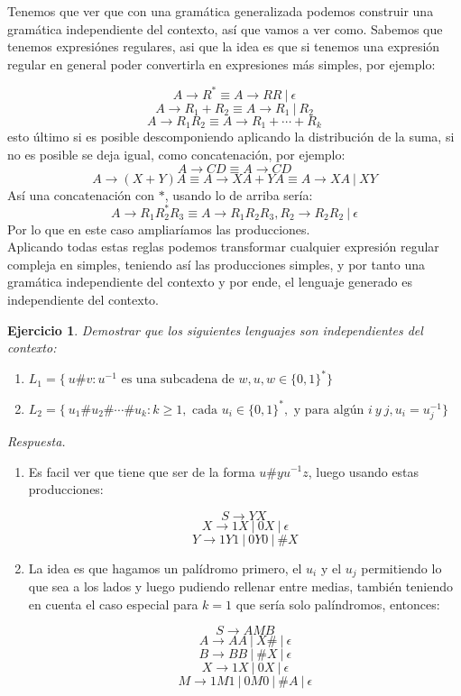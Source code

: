 \documentclass[11pt]{article}
\theoremstyle{ejercicio-style}
\newtheorem{ejer}{Ejercicio}
\begin{document}
\framebox{$\Leftarrow$} Tenemos que ver que con una gramática generalizada podemos construir una gramática independiente del contexto, así que vamos a ver como. Sabemos que tenemos expresiónes regulares, asi que la idea es que si tenemos una expresión regular en general poder convertirla en expresiones más simples, por ejemplo:

$$ A \rightarrow R^* \equiv A \rightarrow RR \ | \ \epsilon $$
$$ A \rightarrow R_1 + R_2 \equiv A \rightarrow R_1 \ | \ R_2 $$
$$ A \rightarrow R_1R_2 \equiv A \rightarrow R_1 + \cdots + R_k $$ esto último si es posible descomponiendo aplicando la distribución de la suma, si no es posible se deja igual, como concatenación, por ejemplo:
$$ A \rightarrow CD \equiv A \rightarrow CD $$
$$ A \rightarrow (X+Y)A \equiv A \rightarrow XA+YA \equiv A \rightarrow XA \ | \ XY $$
Así una concatenación con $*$, usando lo de arriba sería:
$$ A \rightarrow R_1R_2^*R_3 \equiv A \rightarrow R_1R_2R_3, R_2 \rightarrow R_2R_2 \ | \ \epsilon $$
Por lo que en este caso ampliaríamos las producciones. \\


Aplicando todas estas reglas podemos transformar cualquier expresión regular compleja en simples, teniendo así las producciones simples, y por tanto una gramática independiente del contexto y por ende, el lenguaje generado es independiente del contexto.

\newpage

\begin{ejer}
Demostrar que los siguientes lenguajes son independientes del contexto:
\begin{enumerate}
		\item $L_1 = \{ \ u\#v: u^{-1} \text{ es una subcadena de } w, u,w \in \{0,1\}^* \} $
	\item $L_2 = \{ \ u_1\# u_2\# \cdots \#u_k: k \geq 1 , \text{ cada } u_i\in\{0,1\}^*, \text{ y  para algún } i \ y \ j, u_i = u_j^{-1} \} $
\end{enumerate}
\end{ejer}

\emph{Respuesta.}
\begin{enumerate}
	\item Es facil ver que tiene que ser de la forma $u\#yu^{-1}z$, luego usando estas producciones:
	
	$$ S \rightarrow YX \ $$
	$$ X \rightarrow 1X \ | \ 0X \ | \ \epsilon $$
	$$ Y \rightarrow 1Y1 \ | \ 0Y0 \ | \ \#X $$
	
	\item La idea es que hagamos un palídromo primero, el $u_i$ y el $u_j$ permitiendo lo que sea a los lados y luego pudiendo rellenar entre medias, también teniendo en cuenta el caso especial para $k=1$ que sería solo palíndromos, entonces:
	
	$$ S \rightarrow AMB $$
	$$ A \rightarrow AA \ | \ X\# \ | \ \epsilon $$
	$$ B \rightarrow BB \ | \ \#X \ | \ \epsilon $$
	$$ X \rightarrow 1X \ | \ 0X \ | \ \epsilon $$
	$$ M \rightarrow 1M1 \ | \ 0M0 \ | \ \#A \ | \ \epsilon $$
\end{enumerate}
\end{document}
